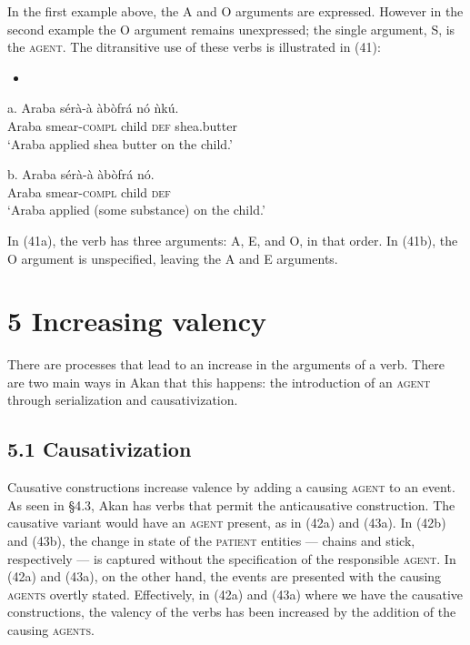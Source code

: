 \documentclass[output=paper]{langsci/langscibook}
\begin{document}
In the first example above, the A and O arguments are expressed. However in the second example the O argument remains unexpressed; the single argument, S, is the \textsc{agent}. The ditransitive use of these verbs is illustrated in (41):

\begin{itemize}
\item \end{itemize}
\gll a.  Araba  s\'{e}r\`{a}-\`{a}    \`{a}b\`{o}fr\'{a}  n\'{o}  \`{n}k\'{u}.\\
       Araba  smear-\textsc{compl}  child  \textsc{def}  shea.butter\\
\glt ‘Araba applied shea butter on the child.’
\z

\gll  b.  Araba  s\'{e}r\`{a}-\`{a}    \`{a}b\`{o}fr\'{a}  n\'{o}.\\
       Araba  smear-\textsc{compl}  child  \textsc{def}\\
\glt ‘Araba applied (some substance) on the child.’
\z

In (41a), the verb has three arguments: A, E, and O, in that order. In (41b), the O argument is unspecified, leaving the A and E arguments.

\chapter[5  Increasing valency]{5  Increasing valency}

There are processes that lead to an increase in the arguments of a verb. There are two main ways in Akan that this happens: the introduction of an \textsc{agent} through serialization and causativization.

\section{5.1  Causativization}

Causative constructions increase valence by adding a causing \textsc{agent} to an event. As seen in §4.3, Akan has verbs that permit the anticausative construction. The causative variant would have an \textsc{agent} present, as in (42a) and (43a). In (42b) and (43b), the change in state of the \textsc{patient} entities — chains and stick, respectively — is captured without the specification of the responsible \textsc{agent}. In (42a) and (43a), on the other hand, the events are presented with the causing \textsc{agents} overtly stated. Effectively, in (42a) and (43a) where we have the causative constructions, the valency of the verbs has been increased by the addition of the causing \textsc{agents}.
\end{document}
